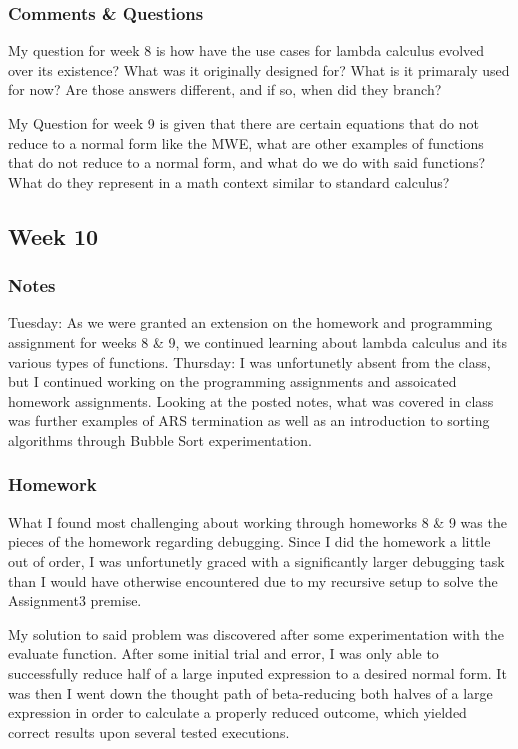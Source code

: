 \documentclass{article}
\theoremstyle{theorem}
\theoremstyle{definition}
\theoremstyle{remark}
\begin{document}
  \subsubsection{Comments \& Questions}
  My question for week 8 is how have the use cases for lambda calculus evolved over its existence? What was it originally designed for? What is it primaraly used for now? Are those answers different, and if so, when did they branch? 
  
  My Question for week 9 is given that there are certain equations that do not reduce to a normal form like the MWE, what are other examples of functions that do not reduce to a normal form, and what do we do with said functions? What do they represent in a math context similar to standard calculus?

  \subsection{Week 10}

  \subsubsection{Notes}
  Tuesday: As we were granted an extension on the homework and programming assignment for weeks 8 \& 9, we continued learning about lambda calculus and its various types of functions. \newline Thursday: I was unfortunetly absent from the class, but I continued working on the programming assignments and assoicated homework assignments. Looking at the posted notes, what was covered in class was further examples of ARS termination as well as an introduction to sorting algorithms through Bubble Sort experimentation.

  \subsubsection{Homework}
  What I found most challenging about working through homeworks 8 \& 9 was the pieces of the homework regarding debugging. Since I did the homework a little out of order, I was unfortunetly graced with a significantly larger debugging task than I would have otherwise encountered due to my recursive setup to solve the Assignment3 premise.
  
  My solution to said problem was discovered after some experimentation with the evaluate function. After some initial trial and error, I was only able to successfully reduce half of a large inputed expression to a desired normal form. It was then I went down the thought path of beta-reducing both halves of a large expression in order to calculate a properly reduced outcome, which yielded correct results upon several tested executions.
  
\end{document}
